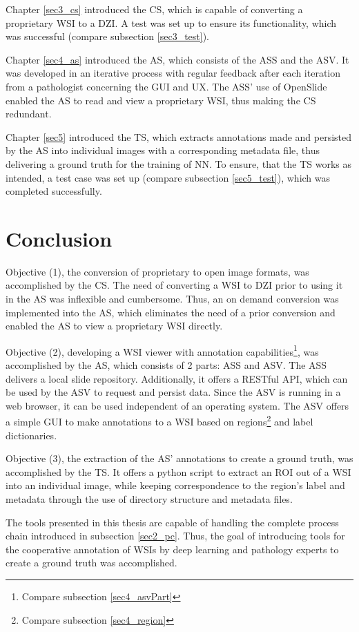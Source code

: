 Chapter \ref{sec3_cs} introduced the CS, which is capable of converting a proprietary WSI to a DZI. A test was set up to ensure its functionality, which was successful (compare subsection \ref{sec3_test}).

Chapter \ref{sec4_as} introduced the AS, which consists of the ASS and the ASV. It was developed in an iterative process with regular feedback after each iteration from a pathologist concerning the GUI and UX. The ASS' use of OpenSlide enabled the AS to read and view a proprietary WSI, thus making the CS redundant.

Chapter \ref{sec5} introduced the TS, which extracts annotations made and persisted by the AS into individual images with a corresponding metadata file, thus delivering a ground truth for the training of NN. To ensure, that the TS works as intended, a test case was set up (compare subsection \ref{sec5_test}), which was completed successfully.


\section{Conclusion}

Objective (1), the conversion of proprietary to open image formats, was accomplished by the CS. The need of converting a WSI to DZI prior to using it in the AS was inflexible and cumbersome. Thus, an on demand conversion was implemented into the AS, which eliminates the need of a prior conversion and enabled the AS to view a proprietary WSI directly.
 
Objective (2), developing a WSI viewer with annotation capabilities\footnote{
	Compare subsection \ref{sec4_asvPart}
}, was accomplished by the AS, which consists of 2 parts: ASS and ASV. The ASS delivers a local slide repository. Additionally, it offers a RESTful API, which can be used by the ASV to request and persist data. Since the ASV is running in a web browser, it can be used independent of an operating system. The ASV offers a simple GUI to make annotations to a WSI based on regions\footnote{
	Compare subsection \ref{sec4_region}
} and label dictionaries.

Objective (3), the extraction of the AS' annotations to create a ground truth, was accomplished by the TS. It offers a python script to extract an ROI out of a WSI into an individual image, while keeping correspondence to the region's label and metadata through the use of directory structure and metadata files.

The tools presented in this thesis are capable of handling the complete process chain introduced in subsection \ref{sec2_pc}. Thus, the goal of introducing tools for the cooperative annotation of WSIs by deep learning and pathology experts to create a ground truth was accomplished.



